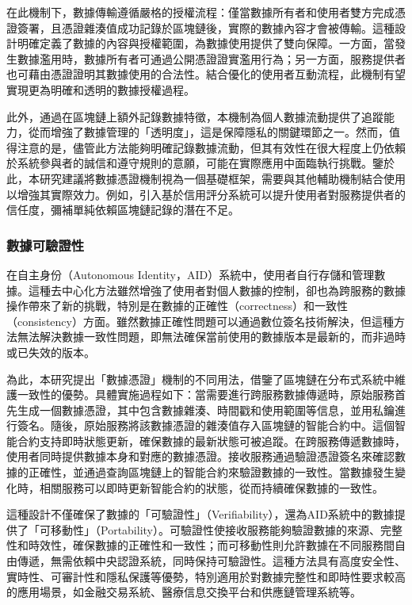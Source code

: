 在此機制下，數據傳輸遵循嚴格的授權流程：僅當數據所有者和使用者雙方完成憑證簽署，且憑證雜湊值成功記錄於區塊鏈後，實際的數據內容才會被傳輸。這種設計明確定義了數據的內容與授權範圍，為數據使用提供了雙向保障。一方面，當發生數據濫用時，數據所有者可通過公開憑證證實濫用行為；另一方面，服務提供者也可藉由憑證證明其數據使用的合法性。結合優化的使用者互動流程，此機制有望實現更為明確和透明的數據授權過程。

此外，通過在區塊鏈上額外記錄數據特徵，本機制為個人數據流動提供了追蹤能力，從而增強了數據管理的「透明度」，這是保障隱私的關鍵環節之一。然而，值得注意的是，儘管此方法能夠明確記錄數據流動，但其有效性在很大程度上仍依賴於系統參與者的誠信和遵守規則的意願，可能在實際應用中面臨執行挑戰。鑒於此，本研究建議將數據憑證機制視為一個基礎框架，需要與其他輔助機制結合使用以增強其實際效力。例如，引入基於信用評分系統可以提升使用者對服務提供者的信任度，彌補單純依賴區塊鏈記錄的潛在不足。
\subsubsection{數據可驗證性}
在自主身份（Autonomous Identity，AID）系統中，使用者自行存儲和管理數據。這種去中心化方法雖然增強了使用者對個人數據的控制，卻也為跨服務的數據操作帶來了新的挑戰，特別是在數據的正確性（correctness）和一致性（consistency）方面。雖然數據正確性問題可以通過數位簽名技術解決，但這種方法無法解決數據一致性問題，即無法確保當前使用的數據版本是最新的，而非過時或已失效的版本。

為此，本研究提出「數據憑證」機制的不同用法，借鑒了區塊鏈在分布式系統中維護一致性的優勢。具體實施過程如下：當需要進行跨服務數據傳遞時，原始服務首先生成一個數據憑證，其中包含數據雜湊、時間戳和使用範圍等信息，並用私鑰進行簽名。隨後，原始服務將該數據憑證的雜湊值存入區塊鏈的智能合約中。這個智能合約支持即時狀態更新，確保數據的最新狀態可被追蹤。在跨服務傳遞數據時，使用者同時提供數據本身和對應的數據憑證。接收服務通過驗證憑證簽名來確認數據的正確性，並通過查詢區塊鏈上的智能合約來驗證數據的一致性。當數據發生變化時，相關服務可以即時更新智能合約的狀態，從而持續確保數據的一致性。

這種設計不僅確保了數據的「可驗證性」（Verifiability），還為AID系統中的數據提供了「可移動性」（Portability）。可驗證性使接收服務能夠驗證數據的來源、完整性和時效性，確保數據的正確性和一致性；而可移動性則允許數據在不同服務間自由傳遞，無需依賴中央認證系統，同時保持可驗證性。這種方法具有高度安全性、實時性、可審計性和隱私保護等優勢，特別適用於對數據完整性和即時性要求較高的應用場景，如金融交易系統、醫療信息交換平台和供應鏈管理系統等。

